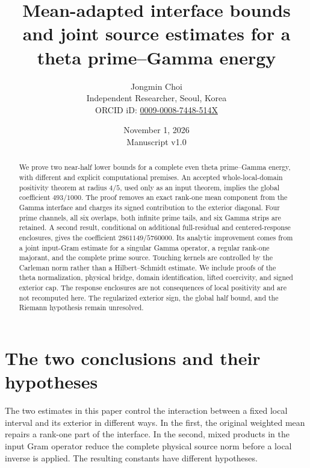 \documentclass[11pt,a4paper]{article}
\title{Mean-adapted interface bounds and joint source estimates for a theta prime--Gamma energy}
\author{Jongmin Choi\\[3pt]\small Independent Researcher, Seoul, Korea\\\small ORCID iD: \href{https://orcid.org/0009-0008-7448-514X}{0009-0008-7448-514X}}
\date{November 1, 2026\\[3pt]\small Manuscript v1.0}
\numberwithin{equation}{section}
\theoremstyle{remark}\newtheorem{remark}[theorem]{Remark}
\begin{document}
\maketitle
\begin{abstract}
We prove two near-half lower bounds for a complete even theta prime--Gamma energy, with different and explicit computational premises. An accepted whole-local-domain positivity theorem at radius $4/5$, used only as an input theorem, implies the global coefficient $493/1000$. The proof removes an exact rank-one mean component from the Gamma interface and charges its signed contribution to the exterior diagonal. Four prime channels, all six overlaps, both infinite prime tails, and six Gamma strips are retained. A second result, conditional on additional full-residual and centered-response enclosures, gives the coefficient $2861149/5760000$. Its analytic improvement comes from a joint input-Gram estimate for a singular Gamma operator, a regular rank-one majorant, and the complete prime source. Touching kernels are controlled by the Carleman norm rather than a Hilbert--Schmidt estimate. We include proofs of the theta normalization, physical bridge, domain identification, lifted coercivity, and signed exterior cap. The response enclosures are not consequences of local positivity and are not recomputed here. The regularized exterior sign, the global half bound, and the Riemann hypothesis remain unresolved.
\end{abstract}

\section{The two conclusions and their hypotheses}
The two estimates in this paper control the interaction between a fixed local interval and its exterior in different ways. In the first, the original weighted mean repairs a rank-one part of the interface. In the second, mixed products in the input Gram operator reduce the complete physical source norm before a local inverse is applied. The resulting constants have different hypotheses.
\end{document}
